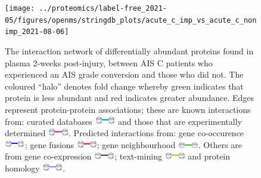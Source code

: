 \documentclass[
]{article}
\begin{document}
\begin{figure}
\texttt{[image: ../proteomics/label-free\_2021-05/figures/openms/stringdb\_plots/acute\_c\_imp\_vs\_acute\_c\_nonimp\_2021-08-06]} \caption{The interaction network of differentially abundant proteins found in plasma 2-weeks post-injury, between AIS C patients who experienced an AIS grade conversion and those who did not. The coloured ``halo'' denotes fold change whereby green indicates that protein is less abundant and red indicates greater abundance. Edges represent protein-protein associations; these are known interactions from: curated databases \includegraphics[width=0.08\textwidth,height=0.02\textheight]{Images/stringdb_curated_db.png} and those that are experimentally determined \includegraphics[width=0.08\textwidth,height=0.02\textheight]{Images/stringdb_experimentally_determined.png}. Predicted interactions from: gene co-occurence \includegraphics[width=0.08\textwidth,height=0.02\textheight]{Images/stringdb_gene_co-occurrence.png}; gene fusions \includegraphics[width=0.08\textwidth,height=0.02\textheight]{Images/stringdb_gene_fusions.png}; gene neighbourhood \includegraphics[width=0.08\textwidth,height=0.02\textheight]{Images/stringdb_gene_neighbour.png}. Others are from gene co-expression \includegraphics[width=0.08\textwidth,height=0.02\textheight]{Images/stringdb_co-expression.png}; text-mining \includegraphics[width=0.08\textwidth,height=0.02\textheight]{Images/stringdb_text_mining.png} and protein homology \includegraphics[width=0.08\textwidth,height=0.02\textheight]{Images/stringdb_protein-homology.png}.}\label{fig:openms-stringdb-chap4-acute-c-imp-vs-nonimp}
\end{figure}
\end{document}
